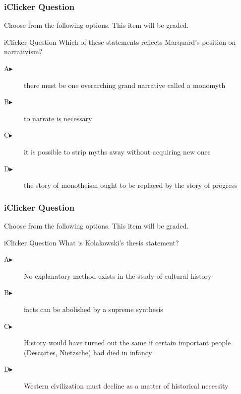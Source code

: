 \documentclass[xcolor=dvipsnames]{beamer}
\begin{document}
\begin{frame}
  \frametitle{iClicker Question}
Choose from the following options. This item will be graded.
\begin{block}{iClicker Question}
Which of these statements reflects Marquard's position on narrativism?
\end{block}
\begin{description}
\item[A\hspace{.2in}$\blacktriangleright$] there must be one
  overarching grand narrative called a monomyth
\item[B\hspace{.2in}$\blacktriangleright$] to narrate is necessary
\item[C\hspace{.2in}$\blacktriangleright$] it is possible to strip
  myths away without acquiring new ones
\item[D\hspace{.2in}$\blacktriangleright$] the story of monotheism
  ought to be replaced by the story of progress
\end{description}
\end{frame}

\begin{frame}
  \frametitle{iClicker Question}
Choose from the following options. This item will be graded.
\begin{block}{iClicker Question}
What is Kolakowski's thesis statement?
\end{block}
\begin{description}
\item[A\hspace{.2in}$\blacktriangleright$] No explanatory method exists in the study of cultural history
\item[B\hspace{.2in}$\blacktriangleright$] facts can be abolished by a supreme synthesis
\item[C\hspace{.2in}$\blacktriangleright$] History would have turned out the same if certain important people (Descartes, Nietzsche) had died in infancy
\item[D\hspace{.2in}$\blacktriangleright$] Western civilization must decline as a matter of historical necessity
\end{description}
\end{frame}
\end{document}
